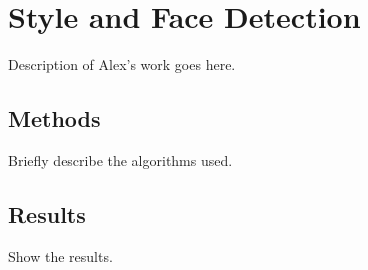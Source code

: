 \section*{Style and Face Detection}

Description of Alex's work goes here.


\subsection*{Methods}

Briefly describe the algorithms used.

\subsection*{Results}

Show the results.
